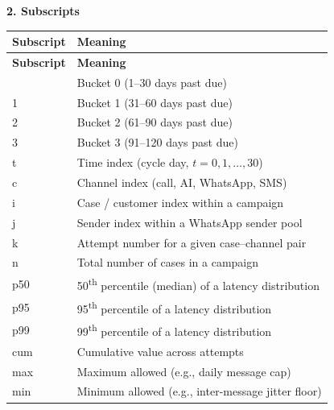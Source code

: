 \vspace{0.6cm}
\noindent\textbf{\large 2. Subscripts}
\vspace{0.2cm}

\noindent
\begin{longtable}{@{}p{} p{}@{}}
\toprule
\textbf{Subscript} & \textbf{Meaning} \\
\midrule
\endfirsthead
\toprule
\textbf{Subscript} & \textbf{Meaning} \\
\midrule
\endhead
\bottomrule
\endfoot
0       & Bucket 0 (1--30 days past due) \\
1       & Bucket 1 (31--60 days past due) \\
2       & Bucket 2 (61--90 days past due) \\
3       & Bucket 3 (91--120 days past due) \\
t       & Time index (cycle day, $t = 0, 1, \ldots, 30$) \\
c       & Channel index (call, AI, WhatsApp, SMS) \\
i       & Case / customer index within a campaign \\
j       & Sender index within a WhatsApp sender pool \\
k       & Attempt number for a given case--channel pair \\
n       & Total number of cases in a campaign \\
p50     & 50\textsuperscript{th} percentile (median) of a latency distribution \\
p95     & 95\textsuperscript{th} percentile of a latency distribution \\
p99     & 99\textsuperscript{th} percentile of a latency distribution \\
cum     & Cumulative value across attempts \\
max     & Maximum allowed (e.g., daily message cap) \\
min     & Minimum allowed (e.g., inter-message jitter floor) \\
\end{longtable}
\clearpage
